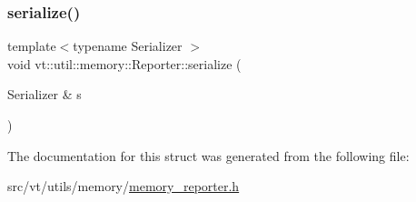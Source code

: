 \mbox{\label{structvt_1_1util_1_1memory_1_1_reporter_af00503d786ee4c923b0a942e52af0429}} 
\subsubsection{\texorpdfstring{serialize()}{serialize()}}
{\footnotesize\ttfamily template$<$typename Serializer $>$ \\
void vt\+::util\+::memory\+::\+Reporter\+::serialize (\begin{DoxyParamCaption}\item[{Serializer \&}]{s }\end{DoxyParamCaption})\hspace{0.3cm}{\ttfamily [inline]}}



The documentation for this struct was generated from the following file\+:\begin{DoxyCompactItemize}
\item 
src/vt/utils/memory/\hyperlink{memory__reporter_8h}{memory\+\_\+reporter.\+h}\end{DoxyCompactItemize}
